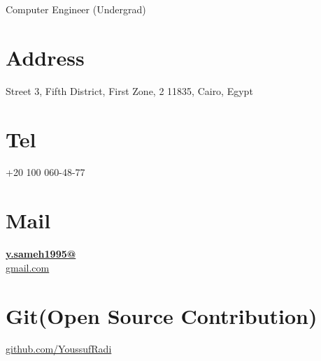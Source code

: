 \documentclass[]{friggeri-cv}
\begin{document}
      {Computer Engineer (Undergrad)}
      

\begin{aside}
  \section{Address}
    Street 3, Fifth District, First Zone, 2
    11835, Cairo, Egypt
    ~
  \section{Tel }
    +20 100 060-48-77
    ~
  \section{Mail}
    \href{mailto:y.sameh1995@gmail.com}{\textbf{y.sameh1995@}\\gmail.com}
    ~
  \section{Git(Open Source Contribution)}
    \href{https://github.com/YoussufRadi}{github.com/YoussufRadi}
    ~

\end{aside}
\end{document}
